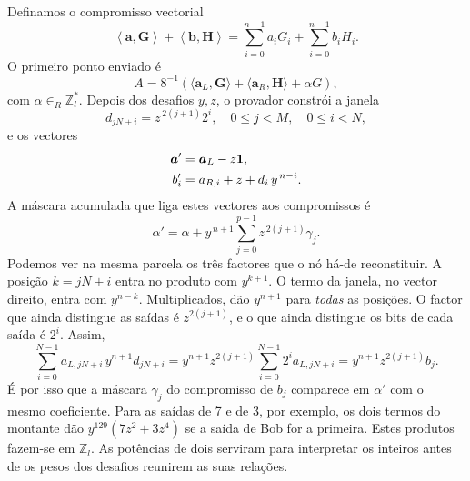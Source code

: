 Definamos o compromisso vectorial
\[
 \left\langle\boldsymbol a,\boldsymbol G\right\rangle+
 \left\langle\boldsymbol b,\boldsymbol H\right\rangle
 =\sum_{i=0}^{n-1}a_iG_i+\sum_{i=0}^{n-1}b_iH_i.
\]
O primeiro ponto enviado é
\begin{equation}
 A=8^{-1}\!\left(
   \langle\boldsymbol a_L,\boldsymbol G\rangle+
   \langle\boldsymbol a_R,\boldsymbol H\rangle+\alpha G
   \right),
 \label{eq:bpp-a}
\end{equation}
com \(\alpha\in_R\mathbb Z_l^*\). Depois dos desafios \(y,z\), o provador
constrói a janela
\begin{equation}
 d_{jN+i}=z^{\,2(j+1)}2^i,
 \quad 0\leq j<M,\quad0\leq i<N,
 \label{eq:bpp-window}
\end{equation}
e os vectores
\begin{align}
 \boldsymbol a'&=\boldsymbol a_L-z\boldsymbol1,\notag\\
 b'_i&=a_{R,i}+z+d_i\,y^{\,n-i}.
 \label{eq:bpp-prime-vectors}
\end{align}
A máscara acumulada que liga estes vectores aos compromissos é
\begin{equation}
 \alpha'=\alpha+y^{\,n+1}
       \sum_{j=0}^{p-1}z^{\,2(j+1)}\gamma_j.
 \label{eq:bpp-alpha-prime}
\end{equation}
Podemos ver na mesma parcela os três factores que o nó há-de
reconstituir. A posição \(k=jN+i\) entra no produto com \(y^{k+1}\).
O termo da janela, no vector direito, entra com \(y^{n-k}\).
Multiplicados, dão \(y^{n+1}\) para \emph{todas} as posições.
O factor que ainda distingue as saídas é \(z^{2(j+1)}\), e o que
ainda distingue os bits de cada saída é \(2^i\). Assim,
\[
 \sum_{i=0}^{N-1} a_{L,jN+i} \,y^{n+1}d_{jN+i}
   = y^{n+1}z^{2(j+1)}\sum_{i=0}^{N-1} 2^i a_{L,jN+i}
   = y^{n+1}z^{2(j+1)} b_j.
\]
É por isso que a máscara \(\gamma_j\) do compromisso de \(b_j\)
comparece em \(\alpha'\) com o mesmo coeficiente. Para as saídas
de 7 e de 3, por exemplo, os dois termos do montante dão
\(y^{129}(7z^2+3z^4)\) se a saída de Bob for a primeira. Estes
produtos fazem-se em \(\mathbb Z_l\). As potências de dois serviram
para interpretar os inteiros antes de os pesos dos desafios reunirem
as suas relações.

